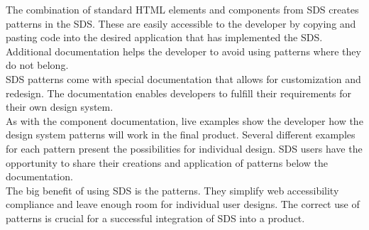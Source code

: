 The combination of standard HTML elements and components from SDS creates patterns in the SDS. These are easily accessible to the developer by copying and pasting code into the desired application that has implemented the SDS. Additional documentation helps the developer to avoid using patterns where they do not belong. \\

SDS patterns come with special documentation that allows for customization and redesign. The documentation enables developers to fulfill their requirements for their own design system.\\

As with the component documentation, live examples show the developer how the design system patterns will work in the final product. Several different examples for each pattern present the possibilities for individual design. \ac{SDS} users have the opportunity to share their creations and application of patterns below the documentation. \\

The big benefit of using SDS is the patterns. They simplify web accessibility compliance and leave enough room for individual user designs. The correct use of patterns is crucial for a successful integration of \ac{SDS} into a product.
